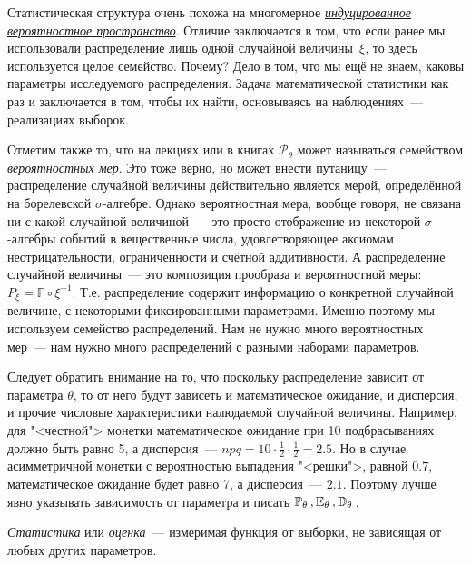 \begin{rmrk}
    Статистическая структура очень похожа на многомерное \hyperlink{induced_prob_space}{\textit{индуцированное вероятностное пространство}}.
    Отличие заключается в том, что если ранее мы использовали распределение лишь одной случайной величины~$\xi$, то здесь используется целое семейство.
    Почему?
    Дело в том, что мы ещё не знаем, каковы параметры исследуемого распределения.
    Задача математической статистики как раз и заключается в том, чтобы их найти, основываясь на наблюдениях~--- реализациях выборок.

    Отметим также то, что на лекциях или в книгах $\mathcal{P}_\theta$ может называться семейством \textit{вероятностных мер}.
    Это тоже верно, но может внести путаницу~--- распределение случайной величины действительно является мерой, определённой на борелевской $\sigma$-алгебре.
    Однако вероятностная мера, вообще говоря, не связана ни с какой случайной величиной~--- это просто отображение из некоторой $\sigma$-алгебры событий в вещественные числа, удовлетворяющее аксиомам неотрицательности, ограниченности и счётной аддитивности.
    А распределение случайной величины~--- это композиция прообраза и вероятностной меры: $P_{\xi} = \mathbb{P} \circ \xi^{-1}$.
    Т.е. распределение содержит информацию о конкретной случайной величине, с некоторыми фиксированными параметрами.
    Именно поэтому мы используем семейство распределений.
    Нам не нужно много вероятностных мер~--- нам нужно много распределений с разными наборами параметров.

    Следует обратить внимание на то, что поскольку распределение зависит от параметра $\theta$, то от него будут зависеть и математическое ожидание, и дисперсия, и прочие числовые характеристики налюдаемой случайной величины.
    Например, для "<честной"> монетки математическое ожидание при 10 подбрасываниях должно быть равно 5, а дисперсия~--- $npq = 10 \cdot \frac{1}{2} \cdot \frac{1}{2} = 2.5$. 
    Но в случае асимметричной монетки с вероятностью выпадения "<решки">, равной $0.7$, математическое ожидание будет равно 7, а дисперсия~--- $2.1$.
    Поэтому лучше явно указывать зависимость от параметра и писать $\mathbb{P}_{\theta}\,, \mathbb{E}_{\theta}\,, \mathbb{D}_{\theta}\,$.
\end{rmrk}

\begin{defn}
    \textit{Статистика} или \textit{оценка}~--- измеримая функция от выборки, не зависящая от любых других параметров.
\end{defn}

